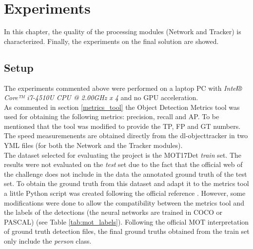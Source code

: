 \chapter{Experiments}
In this chapter, the quality of the processing modules (Network and Tracker) is characterized. Finally, the experiments on the final solution are showed.\\
\section{Setup}
The experiments commented above were performed on a laptop PC with \textit{Intel® Core™ i7-4510U CPU @ 2.00GHz x 4} and no GPU acceleration.\\ As commented in section \ref{metrics_tool} the Object Detection Metrics tool was used for obtaining the following metrics: precision, recall and AP. To be mentioned that the tool was modified to provide the TP, FP and GT numbers. The speed measuremenents are obtained directly from the dl-objecttracker in two YML files (for both the Network and the Tracker modules).\\
The dataset selected for evaluating the project is the MOT17Det \textit{train} set. The results were not evaluated on the \textit{test} set due to the fact that the official web of the challenge does not include in the data the annotated ground truth of the test set. To obtain the ground truth from this dataset and adapt it to the metrics tool a little Python script was created following the official reference \cite{milan2016mot16}. However, some modifications were done to allow the compatibility between the metrics tool and the labels of the detections (the neural networks are trained in COCO or PASCAL) (see Table \ref{tab:mot_labels}). Following the official MOT interpretation of ground truth detection files, the final ground truths obtained from the train set only include the \textit{person} class.
